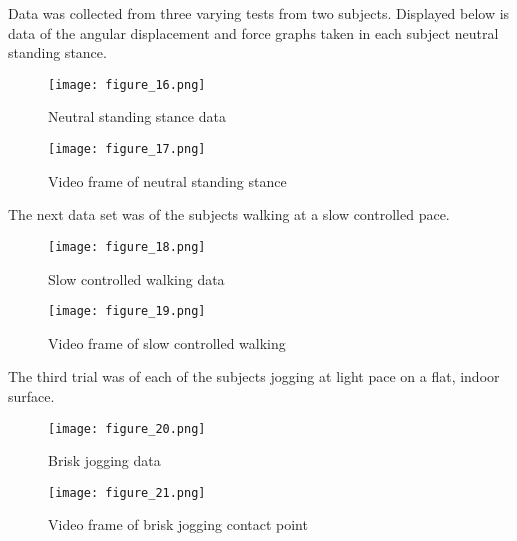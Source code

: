 Data was collected from three varying tests from two subjects.
Displayed below is data of the angular displacement and force graphs taken in each subject neutral standing stance.\par

\begin{figure}[h]
  \centering
  \texttt{[image: figure\_16.png]}
  \caption[Neutral stance data]{Neutral standing stance data}
  \label{fig:x neutral data}
\end{figure}

\begin{figure}[h]
  \centering
  \texttt{[image: figure\_17.png]}
  \caption[Neutral stance frame]{Video frame of neutral standing stance}
  \label{fig:x neutral frame}
\end{figure}

The next data set was of the subjects walking at a slow controlled pace.\par

\begin{figure}[h]
  \centering
  \texttt{[image: figure\_18.png]}
  \caption[Slow walking data]{Slow controlled walking data}
  \label{fig:x slow data}
\end{figure}

\begin{figure}[h]
  \centering
  \texttt{[image: figure\_19.png]}
  \caption[Slow walking frame]{Video frame of slow controlled walking}
  \label{fig:x slow frame}
\end{figure}

The third trial was of each of the subjects jogging at light pace on a flat, indoor surface.\par

\begin{figure}[h]
  \centering
  \texttt{[image: figure\_20.png]}
  \caption[Brisk jogging data]{Brisk jogging data}
  \label{fig:x brisk data}
\end{figure}

\begin{figure}[h]
  \centering
  \texttt{[image: figure\_21.png]}
  \caption[Brisk jogging frame]{Video frame of brisk jogging contact point}
  \label{fig:x brisk frame}
\end{figure}

